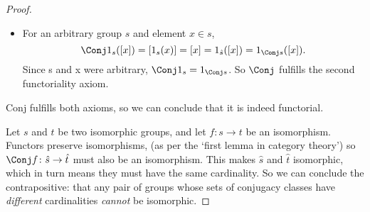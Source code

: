 \documentclass[main.tex]{subfiles}
\begin{document}
\begin{proof}
\begin{itemize}
			\item For an arbitrary group \(s\) and element \(x\in s\),
				\[\Conj 1_s([x])=[1_s(x)]=[x]=1_{\hat{s}}([x])=1_{\Conj s}([x]).\] Since s and x
				were arbitrary, \(\Conj 1_{s}=1_{\Conj s}\). So \(\Conj \) fulfills the second
				functoriality axiom.
		\end{itemize}
		Conj fulfills both axioms, so we can conclude that it is indeed
		functorial.

		Let \(s\) and \(t\) be two isomorphic groups, and let \(f\colon s\to t\) be
		an isomorphism. Functors preserve isomorphisms, (as per the `first lemma in
		category theory') so \(\Conj f\colon \hat{s}\to \hat{t}\) must also be an isomorphism.
		This makes \(\hat{s}\) and \(\hat{t}\) isomorphic, which in turn means they must
		have the same cardinality. So we can conclude the contrapositive: that any
		pair of groups whose sets of conjugacy classes have \textit{different}
		cardinalities \textit{cannot} be isomorphic.

	\end{proof}
	
\end{document}

